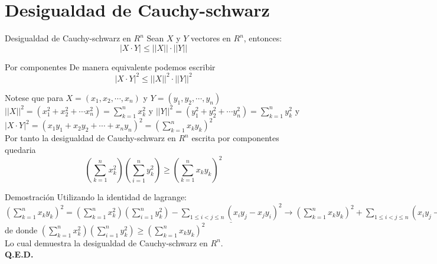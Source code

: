 \section{Desigualdad de Cauchy-schwarz}

\begin{frame}{Desigualdad de Cauchy-schwarz en $R^{n}$}
Sean $X$ y $Y$ vectores en $R^{n}$, entonces: 
\begin{equation*}
    |X \cdot Y| \leq ||X|| \cdot ||Y||
\end{equation*}

\end{frame} 


\begin{frame}{Por componentes}
De manera equivalente podemos escribir 
\begin{equation*}
    |X \cdot Y|^{2} \leq ||X||^{2} \cdot ||Y||^{2}
\end{equation*}


Notese que para $X=(x_{1},x_{2}, \cdots , x_{n})$ y $Y=(y_{1},y_{2}, \cdots , y_{n})$\\ 
$||X||^{2}=(x^{2}_{1}+x^{2}_{2}+ \cdots x^{2}_{n})=\sum_{k=1}^{n}x^{2}_{k}$ y $||Y||^{2}=(y^{2}_{1}+y^{2}_{2}+ \cdots y^{2}_{n})=\sum_{k=1}^{n}y^{2}_{k}$ y \\
$|X \cdot Y|^{2}=(x_{1}y_{1}+x_{2}y_{2}+ \cdots + x_{n}y_{n})^{2}=(\sum_{k=1}^{n}x_{k}y_{k})^{2}$ 
\\ 
Por tanto la desigualdad de Cauchy-schwarz en $R^{n}$ escrita por componentes quedaria 
\begin{equation*}
    (\sum_{k=1}^{n} x^{2}_{k})(\sum_{i=1}^{n}y^{2}_{k}) \geq (\sum_{k=1}^{n}x_{k}y_{k})^{2}
\end{equation*}
\end{frame}

\begin{frame}{Demostración}
Utilizando la identidad de lagrange: 
$(\sum_{k=1}^{n}x_{k}y_{k})^{2} = (\sum_{k=1}^{n} x^{2}_{k})(\sum_{i=1}^{n}y^{2}_{k})- \underline{ \sum_{1\leq i<j \leq n}(x_{i}y_{j}-x_{j}y_{i})^{2}} \to (\sum_{k=1}^{n}x_{k}y_{k})^{2} + \sum_{1\leq i<j \leq n}(x_{i}y_{j}-x_{j}y_{i})^{2} = (\sum_{k=1}^{n} x^{2}_{k})(\sum_{i=1}^{n}y^{2}_{k})$ de donde $(\sum_{k=1}^{n} x^{2}_{k})(\sum_{i=1}^{n}y^{2}_{k}) \geq (\sum_{k=1}^{n}x_{k}y_{k})^{2} $\\Lo cual demuestra la desigualdad de Cauchy-schwarz en $R^{n}$. \\ 
\textbf{Q.E.D.}
\end{frame}
